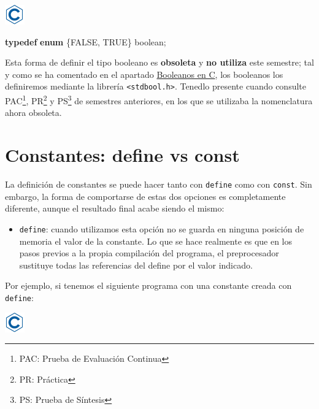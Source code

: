\documentclass[
]{book}
\newenvironment{Shaded}{\begin{snugshade}}{\end{snugshade}}
\newcommand{\KeywordTok}[1]{\textcolor[rgb]{0.13,0.29,0.53}{\textbf{#1}}}
\newcommand{\NormalTok}[1]{#1}
\providecommand{\tightlist}{%
  \setlength{\itemsep}{0pt}\setlength{\parskip}{0pt}}
\begin{document}
\includegraphics{./img/c.png}

\begin{Shaded}
\begin{Highlighting}[]
\KeywordTok{typedef} \KeywordTok{enum}\NormalTok{ \{FALSE, TRUE\} boolean;}
\end{Highlighting}
\end{Shaded}

Esta forma de definir el tipo booleano es \textbf{obsoleta} y \textbf{no utiliza} este semestre; tal y como se ha comentado en el apartado \protect\hyperlink{booleanos-en-c}{Booleanos en C}, los booleanos los definiremos mediante la librería \texttt{\textless{}stdbool.h\textgreater{}}. Tenedlo presente cuando consulte PAC\footnote{PAC: Prueba de Evaluación Continua}, PR\footnote{PR: Práctica} y PS\footnote{PS: Prueba de Síntesis} de semestres anteriores, en los que se utilizaba la nomenclatura ahora obsoleta.

\hypertarget{constantes-define-vs-const}{%
\section{Constantes: define vs const}\label{constantes-define-vs-const}}

La definición de constantes se puede hacer tanto con \texttt{define} como con \texttt{const}. Sin embargo, la forma de comportarse de estas dos opciones es completamente diferente, aunque el resultado final acabe siendo el mismo:

\begin{itemize}
\tightlist
\item
  \texttt{define}: cuando utilizamos esta opción no se guarda en ninguna posición de memoria el valor de la constante. Lo que se hace realmente es que en los pasos previos a la propia compilación del programa, el preprocesador sustituye todas las referencias del define por el valor indicado.
\end{itemize}

Por ejemplo, si tenemos el siguiente programa con una constante creada con \texttt{define}:

\includegraphics{./img/c.png}
\end{document}
